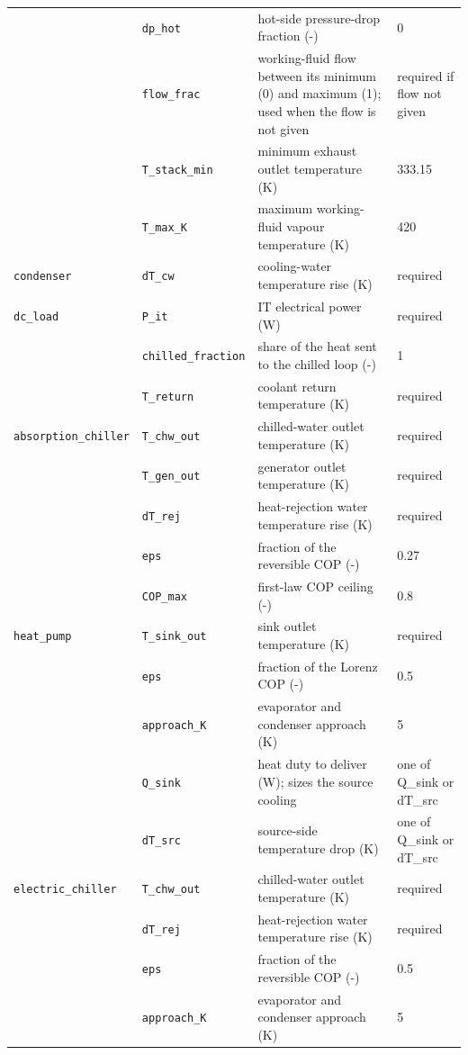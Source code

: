 \begin{longtable}{@{}p{3.1cm}p{2.9cm}p{6.6cm}p{2.0cm}@{}}
 & \texttt{dp\_hot} & hot-side pressure-drop fraction (-) & 0 \\
 & \texttt{flow\_frac} & working-fluid flow between its minimum (0) and maximum (1); used when the flow is not given & required if flow not given \\
 & \texttt{T\_stack\_min} & minimum exhaust outlet temperature (K) & 333.15 \\
 & \texttt{T\_max\_K} & maximum working-fluid vapour temperature (K) & 420 \\
\texttt{condenser} & \texttt{dT\_cw} & cooling-water temperature rise (K) & required \\
\texttt{dc\_load} & \texttt{P\_it} & IT electrical power (W) & required \\
 & \texttt{chilled\_fraction} & share of the heat sent to the chilled loop (-) & 1 \\
 & \texttt{T\_return} & coolant return temperature (K) & required \\
\texttt{absorption\_chiller} & \texttt{T\_chw\_out} & chilled-water outlet temperature (K) & required \\
 & \texttt{T\_gen\_out} & generator outlet temperature (K) & required \\
 & \texttt{dT\_rej} & heat-rejection water temperature rise (K) & required \\
 & \texttt{eps} & fraction of the reversible COP (-) & 0.27 \\
 & \texttt{COP\_max} & first-law COP ceiling (-) & 0.8 \\
\texttt{heat\_pump} & \texttt{T\_sink\_out} & sink outlet temperature (K) & required \\
 & \texttt{eps} & fraction of the Lorenz COP (-) & 0.5 \\
 & \texttt{approach\_K} & evaporator and condenser approach (K) & 5 \\
 & \texttt{Q\_sink} & heat duty to deliver (W); sizes the source cooling & one of Q\_sink or dT\_src \\
 & \texttt{dT\_src} & source-side temperature drop (K) & one of Q\_sink or dT\_src \\
\texttt{electric\_chiller} & \texttt{T\_chw\_out} & chilled-water outlet temperature (K) & required \\
 & \texttt{dT\_rej} & heat-rejection water temperature rise (K) & required \\
 & \texttt{eps} & fraction of the reversible COP (-) & 0.5 \\
 & \texttt{approach\_K} & evaporator and condenser approach (K) & 5 \\

\end{longtable}
